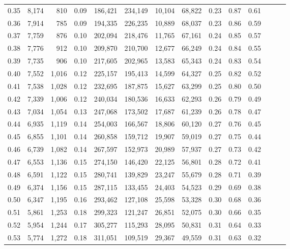 \begin{tabular}{rrrrrrrrrrrrrr}
0.35 &  8,174 &    810 &  0.09 &  186,421 &  234,149 &  10,104 &  68,822 &  0.23 &  0.87 &      0.61 \\
0.36 &  7,914 &    785 &  0.09 &  194,335 &  226,235 &  10,889 &  68,037 &  0.23 &  0.86 &      0.59 \\
0.37 &  7,759 &    876 &  0.10 &  202,094 &  218,476 &  11,765 &  67,161 &  0.24 &  0.85 &      0.57 \\
0.38 &  7,776 &    912 &  0.10 &  209,870 &  210,700 &  12,677 &  66,249 &  0.24 &  0.84 &      0.55 \\
0.39 &  7,735 &    906 &  0.10 &  217,605 &  202,965 &  13,583 &  65,343 &  0.24 &  0.83 &      0.54 \\
0.40 &  7,552 &  1,016 &  0.12 &  225,157 &  195,413 &  14,599 &  64,327 &  0.25 &  0.82 &      0.52 \\
0.41 &  7,538 &  1,028 &  0.12 &  232,695 &  187,875 &  15,627 &  63,299 &  0.25 &  0.80 &      0.50 \\
0.42 &  7,339 &  1,006 &  0.12 &  240,034 &  180,536 &  16,633 &  62,293 &  0.26 &  0.79 &      0.49 \\
0.43 &  7,034 &  1,054 &  0.13 &  247,068 &  173,502 &  17,687 &  61,239 &  0.26 &  0.78 &      0.47 \\
0.44 &  6,935 &  1,119 &  0.14 &  254,003 &  166,567 &  18,806 &  60,120 &  0.27 &  0.76 &      0.45 \\
0.45 &  6,855 &  1,101 &  0.14 &  260,858 &  159,712 &  19,907 &  59,019 &  0.27 &  0.75 &      0.44 \\
0.46 &  6,739 &  1,082 &  0.14 &  267,597 &  152,973 &  20,989 &  57,937 &  0.27 &  0.73 &      0.42 \\
0.47 &  6,553 &  1,136 &  0.15 &  274,150 &  146,420 &  22,125 &  56,801 &  0.28 &  0.72 &      0.41 \\
0.48 &  6,591 &  1,122 &  0.15 &  280,741 &  139,829 &  23,247 &  55,679 &  0.28 &  0.71 &      0.39 \\
0.49 &  6,374 &  1,156 &  0.15 &  287,115 &  133,455 &  24,403 &  54,523 &  0.29 &  0.69 &      0.38 \\
0.50 &  6,347 &  1,195 &  0.16 &  293,462 &  127,108 &  25,598 &  53,328 &  0.30 &  0.68 &      0.36 \\
0.51 &  5,861 &  1,253 &  0.18 &  299,323 &  121,247 &  26,851 &  52,075 &  0.30 &  0.66 &      0.35 \\
0.52 &  5,954 &  1,244 &  0.17 &  305,277 &  115,293 &  28,095 &  50,831 &  0.31 &  0.64 &      0.33 \\
0.53 &  5,774 &  1,272 &  0.18 &  311,051 &  109,519 &  29,367 &  49,559 &  0.31 &  0.63 &      0.32 \\

\end{tabular}
